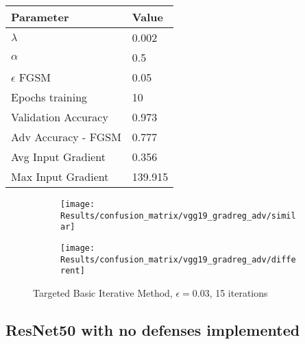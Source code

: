 \documentclass[draft,final]{vutinfth} %
\begin{document}
\begin{table}[h]
  \centering
  \begin{tabular}{ll}
    \toprule
			Parameter			& Value   \\
    \midrule
			$\lambda$								& 0.002				\\
			$\alpha$								& 0.5					\\
			$\epsilon$ FGSM					& 0.05		\\
			Epochs training					& 10			\\
			
			Validation Accuracy			& 0.973		\\ 
			Adv Accuracy - FGSM			& 0.777		\\
			
			Avg Input Gradient			& 0.356	\\
			Max Input Gradient			& 139.915\\
    \bottomrule
  \end{tabular}
\end{table}


\begin{figure}[h]
  \begin{subfigure}[b]{0.5\columnwidth}
		\centering
    \texttt{[image: Results/confusion\_matrix/vgg19\_gradreg\_adv/similar]}
    \label{fig:exp:cm:vgg19_gradreg_adv:similar}
  \end{subfigure}
  \begin{subfigure}[b]{0.5\columnwidth}
		\centering
    \texttt{[image: Results/confusion\_matrix/vgg19\_gradreg\_adv/different]}
    \label{fig:exp:cm:vgg19_gradreg_adv:different}
  \end{subfigure}
  \caption{Targeted Basic Iterative Method, $\epsilon = 0.03$, 15 iterations}
  \label{fig:exp:cm:vgg19_gradreg_adv}
\end{figure}
\clearpage

\subsection{ResNet50 with no defenses implemented}
\end{document}
